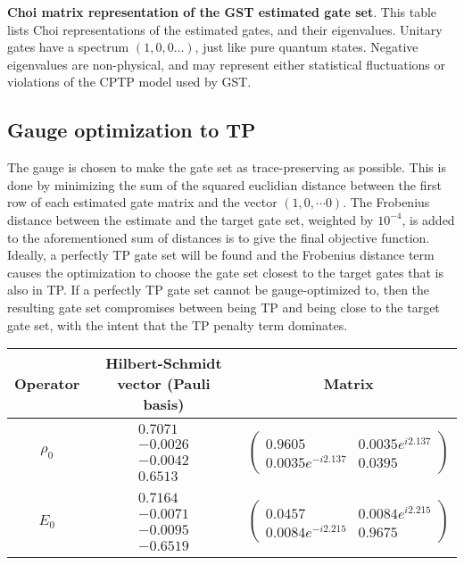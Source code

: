 {\begin{table}[h]
\begin{center}
\caption{\textbf{Choi matrix representation of the GST estimated gate set}.  This table lists Choi representations of the estimated gates, and their eigenvalues.  Unitary gates have a spectrum $(1,0,0\ldots)$, just like pure quantum states.  Negative eigenvalues are non-physical, and may represent either statistical fluctuations or violations of the CPTP model used by GST.\label{bestTargetGatesGatesetChoiTable}}
\end{center}
\end{table}

\clearpage

\subsection{Gauge optimization to TP}
The gauge is chosen to make the gate set as trace-preserving as possible.  This is done by minimizing the sum of the squared euclidian distance between the first row of each estimated gate matrix and the vector $(1,0,\cdots 0)$.  The Frobenius distance between the estimate and the target gate set, weighted by $10^{-4}$, is added to the aforementioned sum of distances is to give the final objective function.  Ideally, a perfectly TP gate set will be found and the Frobenius distance term causes the optimization to choose the gate set closest to the target gates that is also in TP.  If a perfectly TP gate set cannot be gauge-optimized to, then the resulting gate set compromises between being TP and being close to the target gate set, with the intent that the TP penalty term dominates.

\begin{table}[h]
\begin{center}
\begin{tabular}[l]{|c|c|c|}
\hline
Operator & Hilbert-Schmidt vector (Pauli basis) & Matrix \\ \hline
$\rho_{0}$ & $ \begin{array}{c}
0.7071 \\ 
-0.0026 \\ 
-0.0042 \\ 
0.6513
 \end{array} $
 & $ \left(\!\!\begin{array}{cc}
0.9605 & 0.0035e^{i2.137} \\ 
0.0035e^{-i2.137} & 0.0395
 \end{array}\!\!\right) $
 \\ \hline
$E_{0}$ & $ \begin{array}{c}
0.7164 \\ 
-0.0071 \\ 
-0.0095 \\ 
-0.6519
 \end{array} $
 & $ \left(\!\!\begin{array}{cc}
0.0457 & 0.0084e^{i2.215} \\ 
0.0084e^{-i2.215} & 0.9675
 \end{array}\!\!\right) $
 \\ \hline
\end{tabular}


\end{center}
\end{table}}
